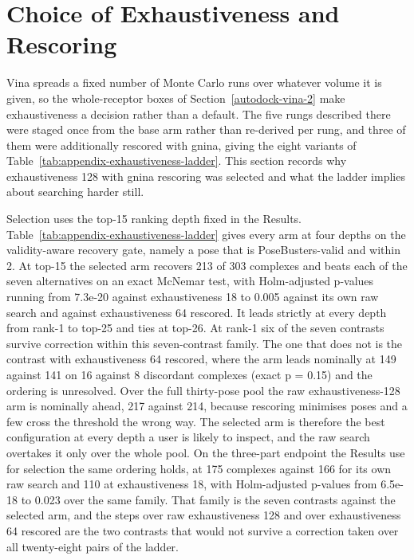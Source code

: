 \hypertarget{exhaustiveness-selection}{%
\section{Choice of Exhaustiveness and Rescoring}\label{exhaustiveness-selection}}

Vina spreads a fixed number of Monte Carlo runs over whatever volume it is given, so the whole-receptor boxes of Section~\ref{autodock-vina-2} make exhaustiveness a decision rather than a default. The five rungs described there were staged once from the base arm rather than re-derived per rung, and three of them were additionally rescored with gnina, giving the eight variants of Table~\ref{tab:appendix-exhaustiveness-ladder}. This section records why exhaustiveness 128 with gnina rescoring was selected and what the ladder implies about searching harder still.

Selection uses the top-15 ranking depth fixed in the Results. Table~\ref{tab:appendix-exhaustiveness-ladder} gives every arm at four depths on the validity-aware recovery gate, namely a pose that is PoseBusters-valid and within 2\angstrom{}. At top-15 the selected arm recovers 213 of 303 complexes and beats each of the seven alternatives on an exact McNemar test, with Holm-adjusted p-values running from 7.3e-20 against exhaustiveness 18 to 0.005 against its own raw search and against exhaustiveness 64 rescored. It leads strictly at every depth from rank-1 to top-25 and ties at top-26. At rank-1 six of the seven contrasts survive correction within this seven-contrast family. The one that does not is the contrast with exhaustiveness 64 rescored, where the arm leads nominally at 149 against 141 on 16 against 8 discordant complexes (exact p = 0.15) and the ordering is unresolved. Over the full thirty-pose pool the raw exhaustiveness-128 arm is nominally ahead, 217 against 214, because rescoring minimises poses and a few cross the threshold the wrong way. The selected arm is therefore the best configuration at every depth a user is likely to inspect, and the raw search overtakes it only over the whole pool. On the three-part endpoint the Results use for selection the same ordering holds, at 175 complexes against 166 for its own raw search and 110 at exhaustiveness 18, with Holm-adjusted p-values from 6.5e-18 to 0.023 over the same family. That family is the seven contrasts against the selected arm, and the steps over raw exhaustiveness 128 and over exhaustiveness 64 rescored are the two contrasts that would not survive a correction taken over all twenty-eight pairs of the ladder.

